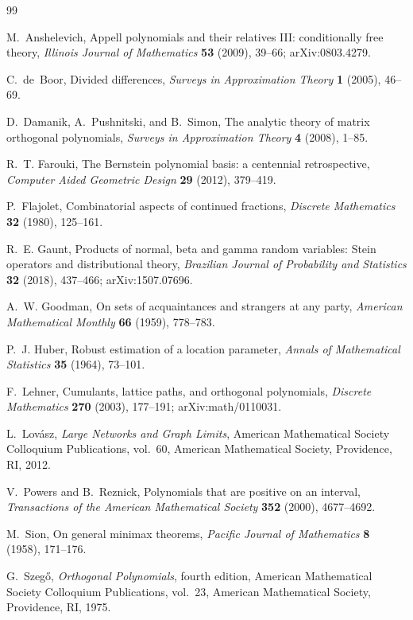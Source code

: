 \documentclass[11pt]{article}
\numberwithin{equation}{section}
\begin{document}
\begin{thebibliography}{99}

   M.~Anshelevich, \newblock Appell polynomials and their relatives III: conditionally free theory, \newblock \emph{Illinois Journal of Mathematics} \textbf{53} (2009), 39--66; \newblock arXiv:0803.4279.

   C.~de~Boor, \newblock Divided differences, \newblock \emph{Surveys in Approximation Theory} \textbf{1} (2005), 46--69.

   D.~Damanik, A.~Pushnitski, and B.~Simon, \newblock The analytic theory of matrix orthogonal polynomials, \newblock \emph{Surveys in Approximation Theory} \textbf{4} (2008), 1--85.

   R.~T. Farouki, \newblock The Bernstein polynomial basis: a centennial retrospective, \newblock \emph{Computer Aided Geometric Design} \textbf{29} (2012), 379--419.

   P.~Flajolet, \newblock Combinatorial aspects of continued fractions, \newblock \emph{Discrete Mathematics} \textbf{32} (1980), 125--161.

   R.~E. Gaunt, \newblock Products of normal, beta and gamma random variables: Stein operators and distributional theory, \newblock \emph{Brazilian Journal of Probability and Statistics} \textbf{32} (2018), 437--466; \newblock arXiv:1507.07696.

   A.~W. Goodman, \newblock On sets of acquaintances and strangers at any party, \newblock \emph{American Mathematical Monthly} \textbf{66} (1959), 778--783.

   P.~J. Huber, \newblock Robust estimation of a location parameter, \newblock \emph{Annals of Mathematical Statistics} \textbf{35} (1964), 73--101.

   F.~Lehner, \newblock Cumulants, lattice paths, and orthogonal polynomials, \newblock \emph{Discrete Mathematics} \textbf{270} (2003), 177--191; \newblock arXiv:math/0110031.

   L.~Lov\'asz, \newblock \emph{Large Networks and Graph Limits}, \newblock American Mathematical Society Colloquium Publications, vol.~60, American Mathematical Society, Providence, RI, 2012.

   V.~Powers and B.~Reznick, \newblock Polynomials that are positive on an interval, \newblock \emph{Transactions of the American Mathematical Society} \textbf{352} (2000), 4677--4692.

   M.~Sion, \newblock On general minimax theorems, \newblock \emph{Pacific Journal of Mathematics} \textbf{8} (1958), 171--176.

   G.~Szeg\H{o}, \newblock \emph{Orthogonal Polynomials}, fourth edition, \newblock American Mathematical Society Colloquium Publications, vol.~23, American Mathematical Society, Providence, RI, 1975.

\end{thebibliography}
\end{document}
